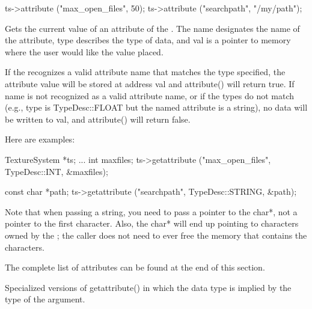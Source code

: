 \begin{code}
      ts->attribute ("max_open_files", 50);
      ts->attribute ("searchpath", "/my/path");
\end{code}

\apiend



Gets the current value of an attribute of the \TextureSystem.
The {\cf name} designates the name of the attribute, {\cf type}
describes the type of data, and {\cf val} is a pointer to memory 
where the user would like the value placed.

If the \TextureSystem recognizes a valid attribute name that matches the
type specified, the attribute value will be stored at address {\cf val}
and {\cf attribute()} will return {\cf true}.  If {\cf name} is not recognized
as a valid attribute name, or if the types do not match (e.g., {\cf
  type} is {\cf TypeDesc::FLOAT} but the named attribute is a string),
no data will be written to {\cf val}, and {\cf attribute()} will return
{\cf false}.

Here are examples:

\begin{code}
      TextureSystem *ts; 
      ...
      int maxfiles;
      ts->getattribute ("max_open_files", TypeDesc::INT, &maxfiles);

      const char *path;
      ts->getattribute ("searchpath", TypeDesc::STRING, &path);
\end{code}

Note that when passing a string, you need to pass a pointer to the {\cf
  char*}, not a pointer to the first character.  Also, the {\cf char*}
will end up pointing to characters owned by the \TextureSystem; the
caller does not need to ever free the memory that contains the
characters.

The complete list of attributes can be found at the end of this section.


\apiend

Specialized versions of {\cf getattribute()} in which the data type is
implied by the type of the argument.

